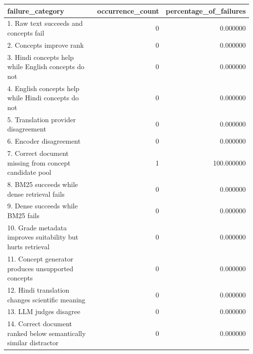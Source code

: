 \begin{tabular}{lrr}
\toprule
failure_category & occurrence_count & percentage_of_failures \\
\midrule
1. Raw text succeeds and concepts fail & 0 & 0.000000 \\
2. Concepts improve rank & 0 & 0.000000 \\
3. Hindi concepts help while English concepts do not & 0 & 0.000000 \\
4. English concepts help while Hindi concepts do not & 0 & 0.000000 \\
5. Translation provider disagreement & 0 & 0.000000 \\
6. Encoder disagreement & 0 & 0.000000 \\
7. Correct document missing from concept candidate pool & 1 & 100.000000 \\
8. BM25 succeeds while dense retrieval fails & 0 & 0.000000 \\
9. Dense succeeds while BM25 fails & 0 & 0.000000 \\
10. Grade metadata improves suitability but hurts retrieval & 0 & 0.000000 \\
11. Concept generator produces unsupported concepts & 0 & 0.000000 \\
12. Hindi translation changes scientific meaning & 0 & 0.000000 \\
13. LLM judges disagree & 0 & 0.000000 \\
14. Correct document ranked below semantically similar distractor & 0 & 0.000000 \\
\bottomrule
\end{tabular}
